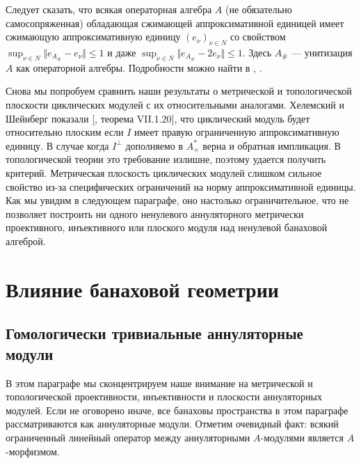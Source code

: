 Следует сказать, что всякая операторная алгебра $A$ (не обязательно самосопряженная) обладающая сжимающей аппроксимативной единицей имеет сжимающую аппроксимативную единицу $(e_\nu)_{\nu\in N}$ со свойством $\sup_{\nu\in N}\Vert e_{A_\#}-e_\nu\Vert\leq 1$ и даже $\sup_{\nu\in N}\Vert e_{A_\#}-2e_\nu\Vert\leq 1$. Здесь $A_\#$ --- унитизация $A$ как операторной алгебры. Подробности можно найти в \cite{PosAndApproxIdinBanAlg}, \cite{BleContrAppIdInOpAlg}.

Снова мы попробуем сравнить наши результаты о метрической и топологической плоскости циклических модулей с их относительными аналогами. Хелемский и Шейнберг показали [\cite{HelHomolBanTopAlg}, теорема VII.1.20], что циклический модуль будет относительно плоским если $I$ имеет правую ограниченную аппроксимативную единицу. В случае когда $I^\perp$ дополняемо в $A_\times^*$ верна и обратная импликация. В топологической теории это требование излишне, поэтому удается получить критерий. Метрическая плоскость циклических модулей слишком сильное свойство из-за специфических ограничений на норму аппроксимативной единицы. Как мы увидим в следующем параграфе, оно настолько ограничительное, что не позволяет построить ни одного ненулевого аннуляторного метрически проективного, инъективного или плоского модуля над ненулевой банаховой алгеброй.


\section{Влияние банаховой геометрии}
\label{SectionTheImpactOfBanachGeometry}



\subsection{Гомологически тривиальные аннуляторные модули}
\label{SubSectionHomoligicallyTrivialAnnihilatorModules}

В этом параграфе мы сконцентрируем наше внимание на метрической и топологической проективности, инъективности и плоскости аннуляторных модулей. Если не оговорено иначе, все банаховы пространства в этом параграфе рассматриваются как аннуляторные модули. Отметим очевидный факт: всякий ограниченный линейный оператор между аннуляторными $A$-модулями является $A$-морфизмом.

